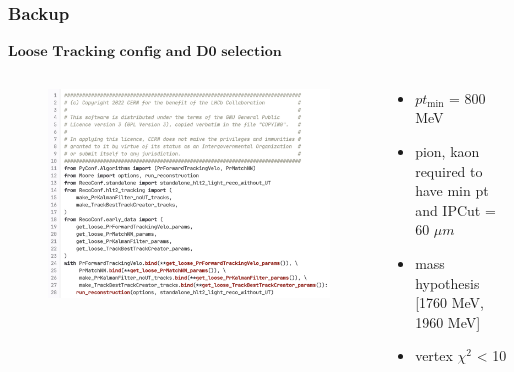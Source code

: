 \documentclass[aspectratio=1610, 12pt, xcolor=dvipsnames]{beamer}
\begin{document}
\begin{frame}\frametitle{Backup}
  $\textbf{Loose Tracking config and D0 selection}$
  \begin{columns}
    \begin{column}[c]{0.48\textwidth}
      \begin{figure}
        \includegraphics[width=\textwidth]{plots/loose_tracking.png}
      \end{figure}
    \end{column}
    \begin{column}[c]{0.48\textwidth}
      \begin{itemize}
        \item $pt_\text{min}$ = 800 MeV
        \item pion, kaon required to have min pt and IPCut = 60 $\mu m$
        \item mass hypothesis [1760 MeV, 1960 MeV]
        \item vertex $\chi^2$ < 10
      \end{itemize}
    \end{column}
  \end{columns}
\end{frame}
\end{document}
